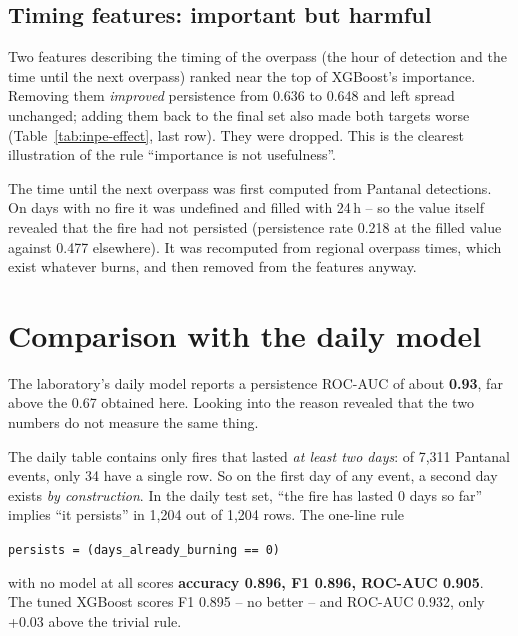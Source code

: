 \documentclass[11pt,a4paper,oneside]{report}
\newcommand{\code}[1]{\texttt{\small #1}}
\begin{document}
\subsection{Timing features: important but harmful}\label{sec:timing}

Two features describing the timing of the overpass (the hour of detection and the
time until the next overpass) ranked near the top of XGBoost's importance.
Removing them \emph{improved} persistence from 0.636 to 0.648 and left spread
unchanged; adding them back to the final set also made both targets worse
(Table~\ref{tab:inpe-effect}, last row). They were dropped. This is the clearest
illustration of the rule \enquote{importance is not usefulness}.

\begin{warnbox}
The time until the next overpass was first computed from Pantanal detections. On
days with no fire it was undefined and filled with 24\,h -- so the value itself
revealed that the fire had not persisted (persistence rate 0.218 at the filled
value against 0.477 elsewhere). It was recomputed from regional overpass times,
which exist whatever burns, and then removed from the features anyway.
\end{warnbox}

\section{Comparison with the daily model}\label{sec:daily-artifact}

The laboratory's daily model reports a persistence ROC-AUC of about
\textbf{0.93}, far above the 0.67 obtained here. Looking into the reason
revealed that the two numbers do not measure the same thing.

The daily table contains only fires that lasted \emph{at least two days}: of
7{,}311 Pantanal events, only 34 have a single row. So on the first day of any
event, a second day exists \emph{by construction}. In the daily test set,
\enquote{the fire has lasted 0 days so far} implies \enquote{it persists} in
1{,}204 out of 1{,}204 rows. The one-line rule
\begin{center}
\code{persists = (days\_already\_burning == 0)}
\end{center}
with no model at all scores \textbf{accuracy 0.896, F1 0.896, ROC-AUC 0.905}. The
tuned XGBoost scores F1 0.895 -- no better -- and ROC-AUC 0.932, only +0.03
above the trivial rule.
\end{document}
